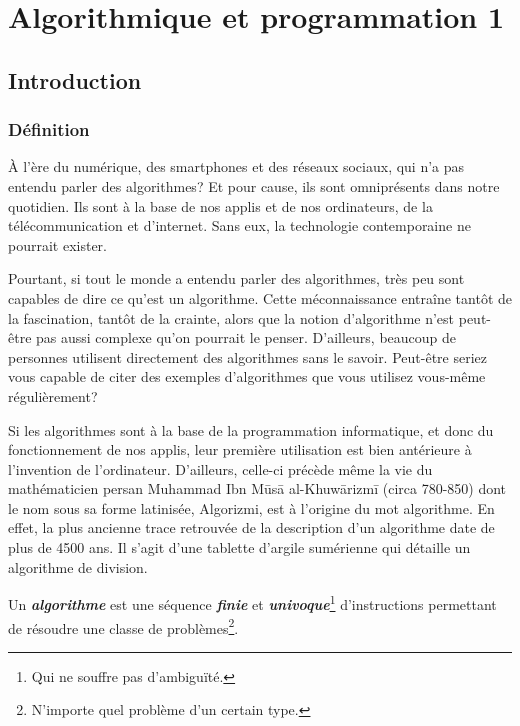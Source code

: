 \chapter{Algorithmique et programmation 1}

\section{Introduction}

\subsection{Définition}

À l'ère du numérique, des smartphones et des réseaux sociaux, qui n'a pas entendu parler des algorithmes? Et pour cause, ils sont omniprésents dans notre quotidien. Ils sont à la base de nos applis et de nos ordinateurs, de la télécommunication et d'internet. Sans eux, la technologie contemporaine ne pourrait exister.



Pourtant, si tout le monde a entendu parler des algorithmes, très peu sont capables de dire ce qu'est un algorithme. Cette méconnaissance entraîne tantôt de la fascination, tantôt de la crainte, alors que la notion d'algorithme n'est peut-être pas aussi complexe qu'on pourrait le penser. D'ailleurs, beaucoup de personnes utilisent directement des algorithmes sans le savoir. Peut-être seriez vous capable de citer des exemples d'algorithmes que vous utilisez vous-même régulièrement?

Si les algorithmes sont à la base de la programmation informatique, et donc du fonctionnement de nos applis, leur première utilisation est bien antérieure à l'invention de l'ordinateur. D'ailleurs, celle-ci précède même la vie du mathématicien persan Muhammad Ibn Mūsā al-Khuwārizmī (circa 780-850) dont le nom sous sa forme latinisée, Algorizmi, est à l'origine du mot algorithme. En effet, la plus ancienne trace retrouvée de la description d'un algorithme date de plus de 4500 ans. Il s'agit d'une tablette d'argile sumérienne qui détaille un algorithme de division.

\begin{definition}
	Un \textit{\textbf{algorithme}} est une séquence \textbf{\textit{finie}} et \textbf{\textit{univoque}}\footnote{Qui ne souffre pas d'ambiguïté.} d'instructions permettant de résoudre une classe de problèmes\footnote{N'importe quel problème d'un certain type.}.
\end{definition}

